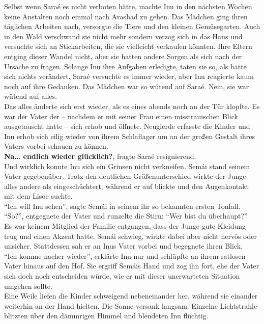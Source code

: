Selbst wenn Saraé es nicht verboten hätte, machte Inu in den nächsten Wochen keine Anstalten noch 
einmal nach Arashad zu gehen. Das Mädchen ging ihren täglichen Arbeiten nach, versorgte die Tiere 
und den kleinen Gemüsegarten. Auch in den Wald verschwand sie nicht mehr sondern verzog sich in das 
Haus und versuchte sich an Stickarbeiten, die sie vielleicht verkaufen könnten. Ihre Eltern entging 
dieser Wandel nicht, aber sie hatten andere Sorgen als sich nach der Ursache zu fragen. Solange Inu 
ihre Aufgaben erledigte, taten sie so, als hätte sich nichts verändert. Saraé versuchte es immer 
wieder, aber Inu reagierte kaum noch auf ihre Gedanken. Das Mädchen war so wütend auf Saraé. Nein, 
sie war wütend auf alles. \\
Das alles änderte sich erst wieder, als es eines abends noch an der Tür klopfte. Es war der Vater 
der – nachdem er mit seiner Frau einen misstrauischen Blick ausgetauscht hatte – sich erhob und 
öffnete. Neugierde erfasste die Kinder und Inu erhob sich eilig wieder von ihrem Schlaflager um an 
der großen Gestalt ihres Vaters vorbei schauen zu können.\\
\textbf{Na… endlich wieder glücklich?}, fragte Saraé resignierend.\\
Und wirklich konnte Inu sich ein Grinsen nicht verkneifen. Semái stand seinem Vater gegebenüber. 
Trotz den deutlichen Größenunterschied wirkte der Junge alles andere als eingeschüchtert, während 
er auf blickte und den Augenkontakt mit dem Lisoe suchte. \\
``Ich will Inu sehen'', sagte Semái in seinem ihr so bekannten ersten Tonfall. \\
``So?'', entgegnete der Vater und runzelte die Stirn: ``Wer bist du überhaupt?''\\
Es war keinem Mitglied der Familie entgangen, dass der Junge gute Kleidung trug und einen Akzent 
hatte. Semái schwieg, wirkte dabei aber nicht nervös oder unsicher. Stattdessen sah er an Inus 
Vater vorbei und begegnete ihren Blick.\\
``Ich komme nacher wieder'', erklärte Inu nur und schlüpfte an ihrem ratlosen Vater hinaus auf den 
Hof. Sie ergriff Semáis Hand und zog ihn fort, ehe der Vater sich doch noch entscheiden würde, wie 
er mit dieser unerwarteten Situation umgehen sollte. \\
Eine Weile liefen die Kinder schweigend nebeneinander her, während sie einander weiterhin an der 
Hand hielten. Die Sonne versank langsam. Einzelne Lichtstrahle blitzten über den dämmrigen Himmel 
und blendeten Inu flüchtig.\\
